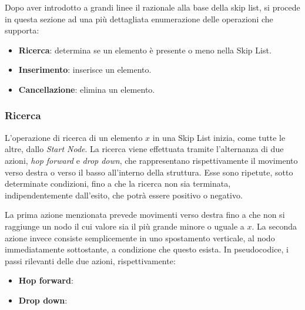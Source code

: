 		Dopo aver introdotto a grandi linee il razionale alla base della skip list, si procede in questa sezione ad una più dettagliata enumerazione delle operazioni che supporta:
		\begin{itemize} 
			\item \textbf{Ricerca}: determina se un elemento è presente o meno nella Skip List.
			\item \textbf{Inserimento}: inserisce un elemento.
			\item \textbf{Cancellazione}: elimina un elemento.
		\end{itemize} 
	
		\subsubsection{Ricerca}
			
			L'operazione di ricerca di un elemento $ x $ in una Skip List inizia, come tutte le altre, dallo \textit{Start Node}. La ricerca viene effettuata tramite l'alternanza di due azioni, \textit{hop forward} e \textit{drop down}, che rappresentano rispettivamente il movimento verso destra o verso il basso all'interno della struttura. Esse sono ripetute, sotto determinate condizioni, fino a che la ricerca non sia terminata, indipendentemente dall'esito, che potrà essere positivo o negativo.
			
			La prima azione menzionata prevede movimenti verso destra fino a che non si raggiunge un nodo il cui valore sia il più grande minore o uguale a $ x $. La seconda azione invece consiste semplicemente in uno spostamento verticale, al nodo immediatamente sottostante, a condizione che questo esista.  In pseudocodice, i passi rilevanti delle due azioni, rispettivamente: 
			
			\begin{itemize}
			
			\item \textbf{Hop forward}:
				\begin{algorithm}[H]
				\end{algorithm}
			
			\item \textbf{Drop down}:
				\begin{algorithm}[H]
				\end{algorithm}
			\end{itemize} 
			

